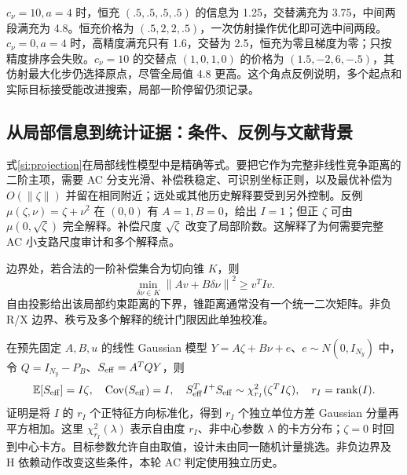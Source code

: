 \documentclass[UTF8,fontset=fandol,11pt,a4paper]{ctexart}
\newcommand{\norm}[1]{\left\lVert#1\right\rVert}
\begin{document}
$c_\nu=10,a=4$ 时，恒充 $(.5,.5,.5,.5)$ 的信息为 1.25，交替满充为 3.75，中间两段满充为 4.8。恒充价格为 $(.5,2,2,.5)$，一次仿射操作优化即可选中间两段。$c_\nu=0,a=4$ 时，高精度满充只有 1.6，交替为 2.5，恒充为零且梯度为零；只按精度排序会失败。$c_\nu=10$ 的交替点 $(1,0,1,0)$ 的价格为 $(1.5,-2,6,-.5)$，其仿射最大化步仍选择原点，尽管全局值 4.8 更高。这个角点反例说明，多个起点和实际目标接受能改进搜索，局部一阶停留仍须记录。

\subsection{从局部信息到统计证据：条件、反例与文献背景}

式\eqref{si:projection}在局部线性模型中是精确等式。要把它作为完整非线性竞争距离的二阶主项，需要 AC 分支光滑、补偿秩稳定、可识别坐标正则，以及最优补偿为 $O(\norm{\zeta})$ 并留在相同附近；远处或其他历史解释要受到另外控制。反例 $\mu(\zeta,\nu)=\zeta+\nu^2$ 在 $(0,0)$ 有 $A=1,B=0$，给出 $I=1$；但正 $\zeta$ 可由 $\mu(0,\sqrt\zeta)$ 完全解释。补偿尺度 $\sqrt\zeta$ 改变了局部阶数。这解释了为何需要完整 AC 小支路尺度审计和多个解释点。

边界处，若合法的一阶补偿集合为切向锥 $K$，则
\begin{equation}
 \min_{\delta\nu\in K}\norm{Av+B\delta\nu}^2\ge v^TIv.
 \label{si:cone}
\end{equation}
自由投影给出该局部约束距离的下界，锥距离通常没有一个统一二次矩阵。非负 R/X 边界、秩亏及多个解释的统计门限因此单独校准。

在预先固定 $A,B,u$ 的线性 Gaussian 模型
$Y=A\zeta+B\nu+e$、$e\sim N(0,I_{N_y})$ 中，令 $Q=I_{N_y}-P_B$、$S_{\rm eff}=A^TQY$，则
\begin{equation}
 \mathbb E[S_{\rm eff}]=I\zeta,\quad
 \operatorname{Cov}(S_{\rm eff})=I,\quad
 S_{\rm eff}^TI^+S_{\rm eff}\sim\chi_{r_I}^2(\zeta^TI\zeta),\quad r_I=\operatorname{rank}(I).
 \label{si:fixed-test}
\end{equation}
证明是将 $I$ 的 $r_I$ 个正特征方向标准化，得到 $r_I$ 个独立单位方差 Gaussian 分量再平方相加。这里 $\chi_{r_I}^2(\lambda)$ 表示自由度 $r_I$、非中心参数 $\lambda$ 的卡方分布；$\zeta=0$ 时回到中心卡方。目标参数允许自由取值，设计未由同一随机计量挑选。非负边界及 H 依赖动作改变这些条件，本轮 AC 判定使用独立历史。
\end{document}
